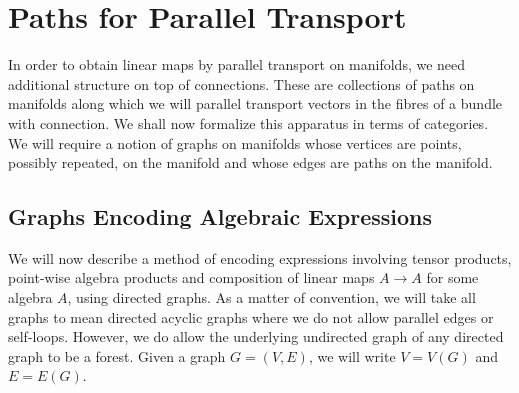 \documentclass[./Thick_TQFTs_and_Quantum_Information.tex]{subfiles}
\begin{document}
\section{Paths for Parallel Transport}

In order to obtain linear maps by parallel transport on manifolds, we need
additional structure on top of connections. These are collections of paths on
manifolds along which we will parallel transport vectors in the fibres of a
bundle with connection. We shall now formalize this apparatus in terms of
categories. We will require a notion of graphs on manifolds whose vertices are
points, possibly repeated, on the manifold and whose edges are paths on the
manifold.

\subsection{Graphs Encoding Algebraic Expressions}

We will now describe a method of encoding expressions involving tensor products,
point-wise algebra products and composition of linear maps $A \to A$ for some
algebra $A$, using directed graphs. As a matter of convention, we will take all
graphs to mean directed acyclic graphs where we do not allow parallel edges or
self-loops. However, we do allow the underlying undirected graph of any directed
graph to be a forest. Given a graph $G = (V, E)$, we will write $V = V(G)$ and
$E = E(G)$.
\end{document}
